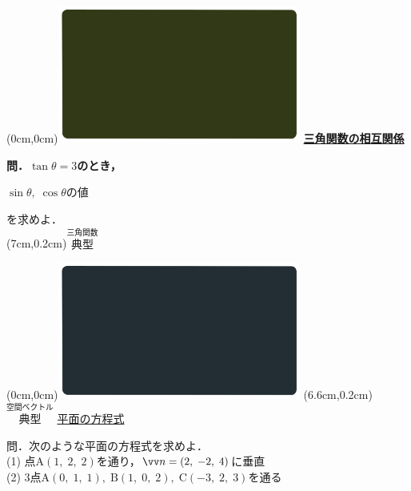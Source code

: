 \documentclass[10pt,
fleqn,
dvipdfmx,
uplatex
]{jsarticle}
\begin{document}
\newpage

\at(0cm,0cm){\includegraphics[width=8cm,bb=0 0 1920 1080]{./youtube/thumbnails/templates/smart_background/三角関数.jpeg}}
{\color{orange}\bf\boldmath\LARGE\underline{三角関数の相互関係}}\vspace{0.3zw}

\huge
\bf\boldmath 問．$\tan \theta =3$のとき，

\Huge
\hspace{0.2zw} $\sin \theta ,\;\cos \theta$の値 \hfill \hspace{0.2zw}

\huge
\hfill を求めよ．\\

\at(7cm,0.2cm){\small\color{bradorange}$\overset{\text{三角関数}}{\text{典型}}$}



\newpage



\at(0cm,0cm){\includegraphics[width=8cm,bb=0 0 1920 1080]{./youtube/thumbnails/templates/smart_background/空間ベクトル.jpeg}}
\at(6.6cm,0.2cm){\small\color{bradorange}$\overset{\text{空間ベクトル}}{\text{典型}}$}
{\color{orange}\huge\underline{平面の方程式}}\vspace{0.3zw}

\large 
問．次のような平面の方程式を求めよ．\\
(1)  点$\text{A}\left(1,\;2,\;2\right)$を通り，$\vv n=\left(2,\;-2,\;4\right)$に垂直\\
(2)  $3$点$\text{A}\left(0,\;1,\;1\right),\;\text{B}\left(1,\;0,\;2\right),\;\text{C}\left(-3,\;2,\;3\right)$を通る\\
\end{document}
